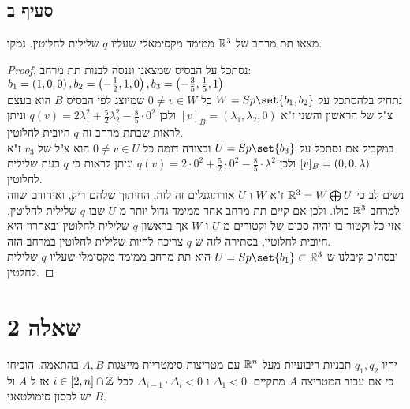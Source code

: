 \documentclass{article}
\DeclarePairedDelimiter\set\{\}
\begin{document}
    \pagebreak
    \subsection*{סעיף ב}
    מצאו תת מרחב של $\mathbb{R}^3$ ממימד מקסימאלי שעליו $q$ שלילית לחלוטין. נמקו.
    \begin{proof}
        נסתכל על הבסיס שמצאנו וננסה לבנות תת מרחב: $b_1 = \left( 1,0,0 \right), b_2 = \left( -\frac{1}{2},1,0 \right), b_3 = \left( -\frac{3}{5},\frac{1}{5},1 \right)$ \\
        נתחיל בלהסתכל על $W = Sp\set{b_1, b_2}$ כל $0 \neq v \in W$ שמיוצג לפי הבסיס $B$ הוא בעצם צ"ל של הראשון והשני ז"א $[v]_B = (\lambda_1, \lambda_2, 0)$
        ולכן $q(v) = 2\lambda_1^2 + \frac{5}{2}\lambda_2^2 - \frac{8}{5} \cdot 0^2$ וניתן לראות שבתת מרחב זה $q$ חיובית לחלוטין. \\
        במקביל אם נסתכל על $U = Sp\set{b_3}$ ובצורה דומה כל $0 \neq v \in U$ הוא צ"ל של $v_3$ ז"א $[v]_B = \left( 0,0, \lambda \right)$
        ולכן $q(v) = 2\cdot 0^2 + \frac{5}{2}\cdot 0^2 - \frac{8}{5} \cdot \lambda^2$ וניתן לראות כי $q$ כעת שלילית לחלוטין. \\
        נשים לב כי $\mathbb{R}^3 = W \bigoplus U$ ז"א $W$ ו $U$ אורתוגנלים זה לזה, החיתוך שלהם ריק, ואיחודם שווה למרחב $\mathbb{R}^3$ כולו.
        ולכן אם קיים תת מרחב אחר ממימד גדול יותר מ $U$ שבו $q$ שלילית לחלוטין, אזי כל וקטור בו יהיה סכום של וקטורים מ $U$ ו $W$ אך בראשון $q$ שלילית לחלוטין ובאחרון היא חיובית לחלוטין, בסתירה לזה ש $q$ צריכה להיות שלילית לחלוטין במרחב הזה. \\
        ובסה"כ קיבלנו ש $U = Sp\set{b_1} \subset \RR^3$ הוא תת מרחב ממימד מקסימלי שעליו $q$ שלילית לחלטין.
    \end{proof}

\section*{שאלה 2}
    יהיו $q_1, q_2$ תבניות ריבועיות מעל $\mathbb{R}^n$ עם מטריצות סימטריות מייצגות $A, B$ בהתאמה.
    הוכיחו כי אם עבור המטריצה $A$ מתקיים:
    $\Delta_1 < 0$ ו $\Delta_{i-1} \cdot \Delta_i < 0$ לכל $i \in [2,n] \cap \mathbb{Z}$ אז ל $A$ ול $B$ יש לכסון סימולטאני.
\end{document}
